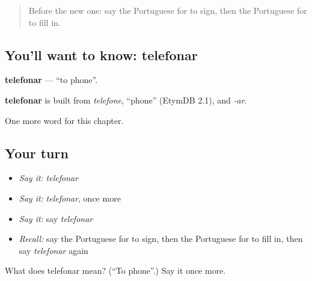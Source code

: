 \begin{quote}
Before the new one: say the Portuguese for to sign, then the Portuguese for to fill in.
\end{quote}

\subsection*{You'll want to know: telefonar}
\textbf{telefonar} — \textquotedblleft{}to phone\textquotedblright{}.

\begin{cousinweb}
\textbf{telefonar} is built from \emph{telefone}, \textquotedblleft{}phone\textquotedblright{} (EtymDB 2.1), and \emph{-ar}.
\end{cousinweb}

\begin{grammarlens}[title={What you've built}]
One more word for this chapter.
\end{grammarlens}

\subsection*{Your turn}
\begin{itemize}
\raggedright
  \item \emph{Say it:} \emph{telefonar}
  \item \emph{Say it:} \emph{telefonar}, once more
  \item \emph{Say it:} say \emph{telefonar}
  \item \emph{Recall:} say the Portuguese for to sign, then the Portuguese for to fill in, then say \emph{telefonar} again
\end{itemize}

\begin{tcolorbox}[breakable,colback=teal!4,colframe=teal!35!black,title={Before you move on}]
What does telefonar mean? (\textquotedblleft{}To phone\textquotedblright{}.) Say it once more.
\end{tcolorbox}
